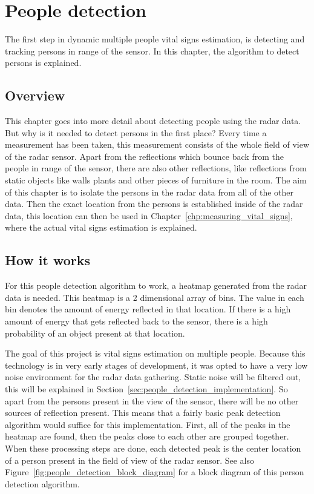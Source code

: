 \chapter{People detection}
\label{chp:people_detection}

The first step in dynamic multiple people vital signs estimation, is detecting and tracking persons in range of the sensor. In this chapter, the algorithm to detect persons is explained.

\section{Overview}
This chapter goes into more detail about detecting people using the radar data. But why is it needed to detect persons in the first place? Every time a measurement has been taken, this measurement consists of the whole field of view of the radar sensor. Apart from the reflections which bounce back from the people in range of the sensor, there are also other reflections, like reflections from static objects like walls plants and other pieces of furniture in the room. The aim of this chapter is to isolate the persons in the radar data from all of the other data. Then the exact location from the persons is established inside of the radar data, this location can then be used in Chapter~\ref{chp:measuring_vital_signs}, where the actual vital signs estimation is explained.

\section{How it works}
For this people detection algorithm to work, a heatmap generated from the radar data is needed. This heatmap is a 2 dimensional array of bins. The value in each bin denotes the amount of energy reflected in that location. If there is a high amount of energy that gets reflected back to the sensor, there is a high probability of an object present at that location. 

The goal of this project is vital signs estimation on multiple people. Because this technology is in very early stages of development, it was opted to have a very low noise environment for the radar data gathering. Static noise will be filtered out, this will be explained in Section~\ref{sec:people_detection_implementation}. So apart from the persons present in the view of the sensor, there will be no other sources of reflection present. This means that a fairly basic peak detection algorithm would suffice for this implementation. First, all of the peaks in the heatmap are found, then the peaks close to each other are grouped together. When these processing steps are done, each detected peak is the center location of a person present in the field of view of the radar sensor. See also Figure~\ref{fig:people_detection_block_diagram} for a block diagram of this person detection algorithm.

